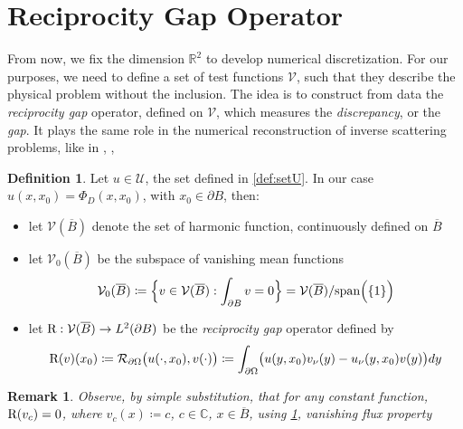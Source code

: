 \documentclass[10pt, a4paper, twoside, openright]{book}
\theoremstyle{definition}
\newtheorem{definition}[subsection]{Definition}
\theoremstyle{plain}
\theoremstyle{plain}
\theoremstyle{plain}
\theoremstyle{plain}
\newtheorem{remark}[subsection]{Remark}
\theoremstyle{plain}
\theoremstyle{plain}
\theoremstyle{plain}
\theoremstyle{plain}
\begin{document}
\section{Reciprocity Gap Operator}
From now, we fix the dimension $\mathbb{R}^2$ to develop numerical discretization. 
For our purposes, we need to define a set of test functions $\mathcal{V}$, such that they describe the physical problem without the inclusion. The idea is to construct from data the \emph{reciprocity gap} operator, defined on $\mathcal{V}$, which measures the \emph{discrepancy}, or the \emph{gap}.
It plays the same role in the numerical reconstruction of inverse scattering problems, like in \cite{colton-haddar:rg}, \cite{dicristo-sun:2006}, \cite{dicristo-sun:2007}
\begin{definition}
\label{def:setV}
Let $u\in\mathcal{U}$, the set defined in \ref{def:setU}. In our case $u(x,x_0)=\Phi_D(x,x_0)$, with $x_0 \in \partial B$, then:
\begin{itemize}
 \item let $\mathcal{V}(\overline{B})$ denote the set of harmonic function, continuously defined on $\overline{B}$
 \item let $\mathcal{V}_0(\overline{B})$ be the subspace of vanishing mean functions
 \begin{equation}
  \mathcal{V}_0(\overline{B})\coloneqq\Bigl\{v\in\mathcal{V}(\overline{B}):\int_{\partial B} v = 0\Bigr\}=\mathcal{V}(\overline{B})/\textup{span}\Bigl(\{1\}\Bigr)
 \end{equation}
 \item let $\textup{R} : \mathcal{V}(\overline{B})\to L^2(\partial B)$ be the \emph{reciprocity gap} operator defined by
\begin{equation}
 \textup{R}(v)(x_0)\coloneqq \mathcal{R}_{\partial\Omega}\bigl(u(\cdot,x_0),v(\cdot)\bigr)\coloneqq \int_{\partial \Omega}\bigl(u(y,x_0)v_\nu (y) - u_\nu(y,x_0)v(y)\bigr)dy
\end{equation}
\end{itemize}
\end{definition}
\begin{center}
\end{center}
\begin{remark}
 \label{rem:kernel-R}
 Observe, by simple substitution, that for any constant function, $\textup{R}(v_c)=0$, where $v_c(x)\coloneqq c$, $c\in\mathbb{C}$, $x\in\overline{B}$, using \ref{}, vanishing flux property
\end{remark}
\end{document}
